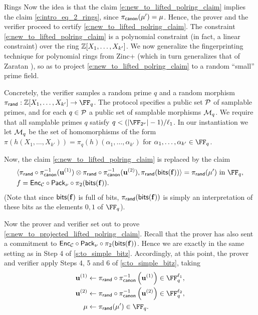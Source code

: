 \begin{lncsmove}{Rings}
Now the idea is that the claim \eqref{e:new_to_lifted_polring_claim} implies the claim \eqref{e:intro_eq_2_rings}, since $\pi_{\mathsf{canon}}(\mu')=\mu$. Hence, the prover and the verifier  proceed to certify  \eqref{e:new_to_lifted_polring_claim}. The constraint \eqref{e:new_to_lifted_polring_claim} is a polynomial constraint (in fact, a linear constraint) over the ring $\mathbb{Z}[X_1,\ldots, X_{k'}]$. We now generalize the fingerprinting technique for polynomial rings from Zinc+ \cite{zincplus} (which in turn generalizes that of Zaratan \cite{zaratan}), so as to project \eqref{e:new_to_lifted_polring_claim} to a random ``small'' prime field.  

Concretely,  the verifier samples a random prime $q$ and a random morphism
%
$
\pirand : \ZZ[X_1, \ldots, X_{k'}] \to \FF_q
$. The protocol specifies a public set $\mathcal{P}$ of samplable primes, and for each $q\in \mathcal{P}$ a public set of samplable morphisms $\mathcal{M}_q$. We require that all samplable primes $q$ satisfy $q< \fieldboundsizeexponent$. In our instantiation we let $\mathcal{M}_q$ be the set of homomorphisms of the form $\pi(h(X_1,\ldots, X_{k'})) = \pi_q(h)(\alpha_1, \ldots, \alpha_{k'})$ for $\alpha_1,\ldots, \alpha_{k'}\in \FF_q$.

Now, the claim \eqref{e:new_to_lifted_polring_claim}  is replaced by the claim
%
\begin{equation}\label{e:new_to_projected_lifted_polring_claim}
\begin{aligned}
&\langle \pirand\circ \picanon^{-1}(\uu^{(1)}) \otimes \pirand\circ \picanon^{-1}(\uu^{(2)}) , \pirand(\bitstext(\bff)) \rangle = \pirand(\mu') \ \text{in } \FF_q,\\ &f = \Enc_\cC\circ \pack \circ \pi_2(\bitstext(\bff)).
\end{aligned}
\end{equation}
(Note that since $\mathsf{bits}(\mathbf{f})$ is full of bits, $\pi_{\mathsf{rand}}(\mathsf{bits}(\mathbf{f}))$ is simply an interpretation of these bits as the elements $0,1$ of $\FF_q$). 

Now the prover and verifier set out to prove \eqref{e:new_to_projected_lifted_polring_claim}. Recall that the prover has also sent a commitment to $\mathsf{Enc}_{\mathcal{C}}\circ \mathsf{Pack}_\nu \circ \pi_2(\mathsf{bits}(\mathbf{f}))$. Hence we are exactly in the same setting as in Step 4 of \cref{s:to_simple_bitz}. Accordingly, at this point, the prover and verifier apply Steps 4, 5 and 6 of \cref{s:to_simple_bitz}, taking 
\begin{align*}
\uu^{(1)}{} &\gets \pirand\circ \picanon^{-1}\left(\uu^{(1)}\right)\in \FF_{q}^{\codedim_1},\\
\uu^{(2)}{} &\gets \pirand\circ \picanon^{-1}\left(\uu^{(2)}\right)\in \FF_{q}^{\codedim_2},\\
\mu&\gets \pirand(\mu')\in \FF_q.
\end{align*}


\end{lncsmove}
